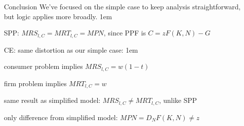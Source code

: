\documentclass[11pt,aspectratio=43]{beamer}
\let\olditemize=\itemize
\let\endolditemize=\enditemize
\renewenvironment{itemize}{\olditemize \itemsep1em}{\endolditemize}
\theoremstyle{definition}
\begin{document}
\begin{frame}{Conclusion}
\label{slide:Conclusion}
    We’ve focused on the simple case to keep analysis straightforward, but logic applies more broadly.
    \begin{itemize}
        \item SPP: $ MRS_{l, C} = MRT_{l, C} = MPN $, since PPF is $ C = z F( K, N ) - G $
        \item CE: same distortion as our simple case:
        \begin{itemize}
            \item consumer problem implies $ MRS_{l, C} = w ( 1-t ) $
            \item firm problem implies $ MRT_{l, C} = w $
            \item same result as simplified model: $ MRS_{l, C} \neq MRT_{l, C} $, unlike SPP
            \item only difference from simplified model: $ MPN = D_{N}F( K, N ) \neq z $
        \end{itemize}
    \end{itemize}
\end{frame}
\end{document}
